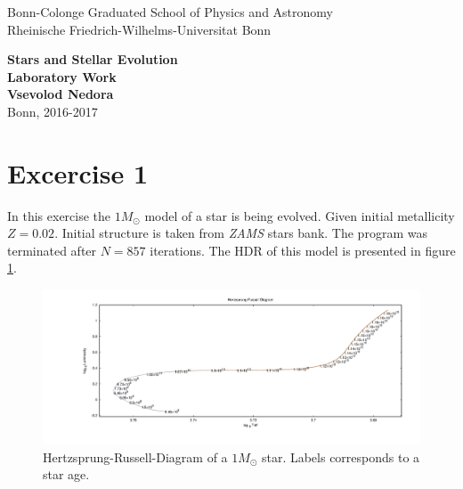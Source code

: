 \documentclass[12pt]{article}
\begin{document}
\thispagestyle{empty}
\begin{center}
\Large{Bonn-Colonge Graduated School of Physics and Astronomy \\
Rheinische Friedrich-Wilhelms-Universitat Bonn}

\vspace*{6.1 cm}
\textbf{\LARGE{Stars and Stellar Evolution\\ Laboratory Work\\[2mm]}}
\textbf{\large{Vsevolod Nedora\\}}
\vspace*{11 cm} \Large{Bonn, 2016-2017}
\end{center}

\newpage

\section{Excercise 1}

In this exercise the $1M_\odot$ model of a star is being evolved. Given initial  metallicity $Z=0.02$. Initial structure is taken from \emph{ZAMS} stars bank. 
The program was terminated after $N=857$ iterations. The HDR of this model is presented in figure \ref{fig:HDR}.
\begin{figure}[ht]
\begin{center}
\includegraphics[width=1.0\textwidth]{hrd.png}
\end{center}
\vspace*{-10mm}
\caption{Hertzsprung-Russell-Diagram of a $1M_\odot$ star. Labels corresponds to a star age.}
\label{fig:HDR}\end{figure}
\subsection{}
\end{document}
